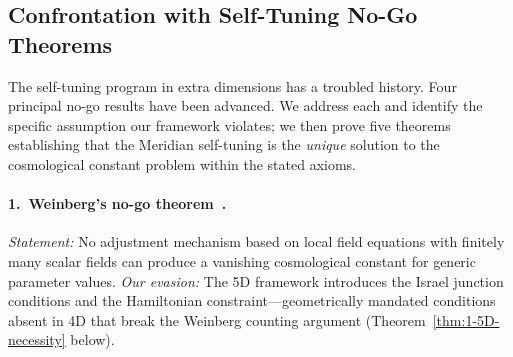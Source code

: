 %
%
%


%
%


%

\subsection{Confrontation with Self-Tuning No-Go Theorems}
\label{sec:1-nogo}

The self-tuning program in extra dimensions has a troubled history. Four principal no-go results have been advanced. We address each and identify the specific assumption our framework violates; we then prove five theorems establishing that the Meridian self-tuning is the \emph{unique} solution to the cosmological constant problem within the stated axioms.

\paragraph{1.\ Weinberg's no-go theorem~\cite{ch1:weinberg89}.}
\emph{Statement:} No adjustment mechanism based on local field equations with finitely many scalar fields can produce a vanishing cosmological constant for generic parameter values. \emph{Our evasion:} The 5D framework introduces the Israel junction conditions and the Hamiltonian constraint---geometrically mandated conditions absent in 4D that break the Weinberg counting argument (Theorem~\ref{thm:1-5D-necessity} below).

